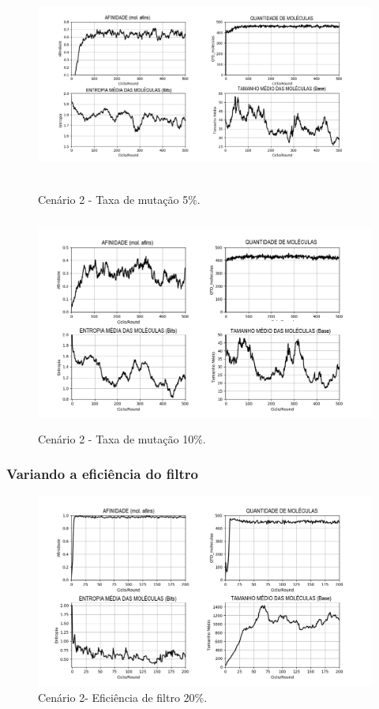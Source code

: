 \begin{figure}[!h]
    \centering
    \includegraphics[width=15cm,height=7cm]{figures/image16_alpha05_beta_20.png}
    \caption{Cenário 2 - Taxa de mutação 5\%.}
    \label{fig:image16_alpha05_beta_20}
\end{figure}

\begin{figure}[!h]
    \centering
    \includegraphics[width=15cm,height=7cm]{figures/image17_alpha10_beta_20.png}
    \caption{Cenário 2 - Taxa de mutação 10\%.}
    \label{fig:image17_alpha10_beta_20}
\end{figure}

\newpage

\subsubsection{Variando a eficiência do filtro}

\begin{figure}[!h]
    \centering
    \includegraphics[width=15cm]{figures/image18_alpha05_beta_20.png}
    \caption{Cenário 2- Eficiência de filtro 20\%.}
    \label{fig:image18_alpha05_beta_20}
\end{figure}

